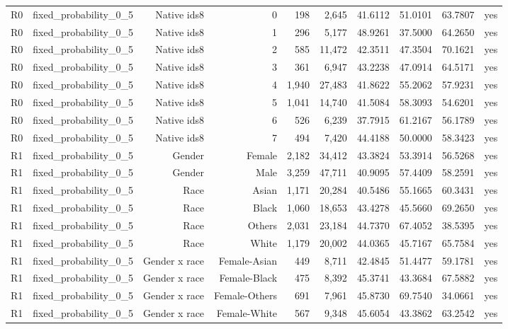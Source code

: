 \documentclass[10pt]{article}
\begin{document}
\begin{longtable}{@{}lrrrrrrrrr@{}}
R0 & fixed\_probability\_0\_5 & Native ids8 & 0 & 198 & 2,645 & 41.6112 & 51.0101 & 63.7807 & yes \\
R0 & fixed\_probability\_0\_5 & Native ids8 & 1 & 296 & 5,177 & 48.9261 & 37.5000 & 64.2650 & yes \\
R0 & fixed\_probability\_0\_5 & Native ids8 & 2 & 585 & 11,472 & 42.3511 & 47.3504 & 70.1621 & yes \\
R0 & fixed\_probability\_0\_5 & Native ids8 & 3 & 361 & 6,947 & 43.2238 & 47.0914 & 64.5171 & yes \\
R0 & fixed\_probability\_0\_5 & Native ids8 & 4 & 1,940 & 27,483 & 41.8622 & 55.2062 & 57.9231 & yes \\
R0 & fixed\_probability\_0\_5 & Native ids8 & 5 & 1,041 & 14,740 & 41.5084 & 58.3093 & 54.6201 & yes \\
R0 & fixed\_probability\_0\_5 & Native ids8 & 6 & 526 & 6,239 & 37.7915 & 61.2167 & 56.1789 & yes \\
R0 & fixed\_probability\_0\_5 & Native ids8 & 7 & 494 & 7,420 & 44.4188 & 50.0000 & 58.3423 & yes \\
R1 & fixed\_probability\_0\_5 & Gender & Female & 2,182 & 34,412 & 43.3824 & 53.3914 & 56.5268 & yes \\
R1 & fixed\_probability\_0\_5 & Gender & Male & 3,259 & 47,711 & 40.9095 & 57.4409 & 58.2591 & yes \\
R1 & fixed\_probability\_0\_5 & Race & Asian & 1,171 & 20,284 & 40.5486 & 55.1665 & 60.3431 & yes \\
R1 & fixed\_probability\_0\_5 & Race & Black & 1,060 & 18,653 & 43.4278 & 45.5660 & 69.2650 & yes \\
R1 & fixed\_probability\_0\_5 & Race & Others & 2,031 & 23,184 & 44.7370 & 67.4052 & 38.5395 & yes \\
R1 & fixed\_probability\_0\_5 & Race & White & 1,179 & 20,002 & 44.0365 & 45.7167 & 65.7584 & yes \\
R1 & fixed\_probability\_0\_5 & Gender x race & Female-Asian & 449 & 8,711 & 42.4845 & 51.4477 & 59.1781 & yes \\
R1 & fixed\_probability\_0\_5 & Gender x race & Female-Black & 475 & 8,392 & 45.3741 & 43.3684 & 67.5882 & yes \\
R1 & fixed\_probability\_0\_5 & Gender x race & Female-Others & 691 & 7,961 & 45.8730 & 69.7540 & 34.0661 & yes \\
R1 & fixed\_probability\_0\_5 & Gender x race & Female-White & 567 & 9,348 & 45.6054 & 43.3862 & 63.2542 & yes \\

\end{longtable}
\end{document}
